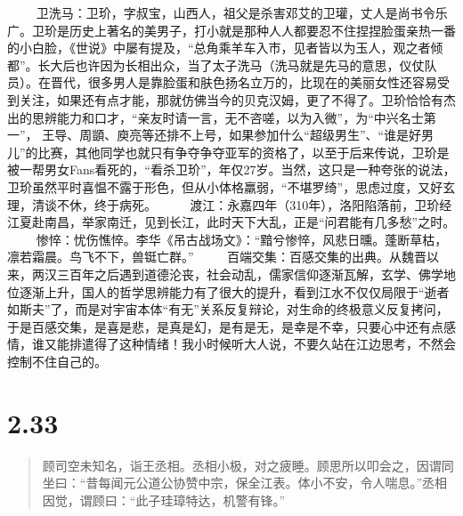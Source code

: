 \documentclass[]{book}
\begin{document}
　　
卫洗马：卫玠，字叔宝，山西人，祖父是杀害邓艾的卫瓘，丈人是尚书令乐广。卫玠是历史上著名的美男子，打小就是那种人人都要忍不住捏捏脸蛋亲热一番的小白脸，《世说》中屡有提及，``总角乘羊车入市，见者皆以为玉人，观之者倾都''。长大后也许因为长相出众，当了太子洗马（洗马就是先马的意思，仪仗队员）。在晋代，很多男人是靠脸蛋和肤色扬名立万的，比现在的美丽女性还容易受到关注，如果还有点才能，那就仿佛当今的贝克汉姆，更了不得了。卫玠恰恰有杰出的思辨能力和口才，``亲友时请一言，无不咨嗟，以为入微''，为``中兴名士第一''，
王导、周顗、庾亮等还排不上号，如果参加什么``超级男生''、``谁是好男儿''的比赛，其他同学也就只有争夺争夺亚军的资格了，以至于后来传说，卫玠是被一帮男女Fans看死的，``看杀卫玠''，年仅27岁。当然，这只是一种夸张的说法，卫玠虽然平时喜愠不露于形色，但从小体格羸弱，``不堪罗绮''，思虑过度，又好玄理，清谈不休，终于病死。
　　
渡江：永嘉四年（310年），洛阳陷落前，卫玠经江夏赴南昌，举家南迁，见到长江，此时天下大乱，正是``问君能有几多愁''之时。
　　
惨悴：忧伤憔悴。李华《吊古战场文》：``黯兮惨悴，风悲日曛。蓬断草枯，凛若霜晨。鸟飞不下，兽铤亡群。''
　　
百端交集：百感交集的出典。从魏晋以来，两汉三百年之后遇到道德沦丧，社会动乱，儒家信仰逐渐瓦解，玄学、佛学地位逐渐上升，国人的哲学思辨能力有了很大的提升，看到江水不仅仅局限于``逝者如斯夫''了，而是对宇宙本体``有无''关系反复辩论，对生命的终极意义反复拷问，于是百感交集，是喜是悲，是真是幻，是有是无，是幸是不幸，只要心中还有点感情，谁又能排遣得了这种情绪！我小时候听大人说，不要久站在江边思考，不然会控制不住自己的。

\section{2.33}\label{section-79}

\begin{quote}
顾司空未知名，诣王丞相。丞相小极，对之疲睡。顾思所以叩会之，因谓同坐曰：``昔每闻元公道公协赞中宗，保全江表。体小不安，令人喘息。''丞相因觉，谓顾曰：``此子珪璋特达，机警有锋。''
\end{quote}
\end{document}
